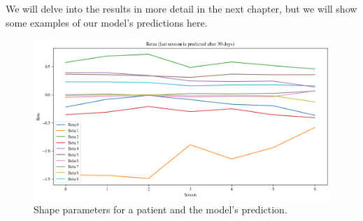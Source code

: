 We will delve into the results in more detail in the next chapter, but we will
show some examples of our model's predictions here.

\begin{figure}[h]
    \centering
    \includegraphics[width=\textwidth]{files/predicted_betas}
    \caption{Shape parameters for a patient and the model's prediction.}
\end{figure}

